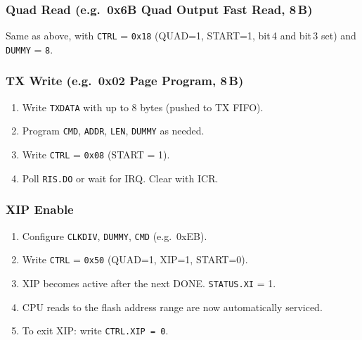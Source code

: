 \subsubsection{Quad Read (e.g.\ 0x6B Quad Output Fast Read, 8\,B)}

Same as above, with \texttt{CTRL} = \texttt{0x18} (QUAD=1, START=1, bit\,4 and bit\,3 set)
and \texttt{DUMMY} = \texttt{8}.

\subsubsection{TX Write (e.g.\ 0x02 Page Program, 8\,B)}

\begin{enumerate}
  \item Write \texttt{TXDATA} with up to 8 bytes (pushed to TX FIFO).
  \item Program \texttt{CMD}, \texttt{ADDR}, \texttt{LEN}, \texttt{DUMMY} as needed.
  \item Write \texttt{CTRL} = \texttt{0x08} (START = 1).
  \item Poll \texttt{RIS.DO} or wait for IRQ. Clear with ICR.
\end{enumerate}

\subsubsection{XIP Enable}

\begin{enumerate}
  \item Configure \texttt{CLKDIV}, \texttt{DUMMY}, \texttt{CMD} (e.g.\ 0xEB).
  \item Write \texttt{CTRL} = \texttt{0x50} (QUAD=1, XIP=1, START=0).
  \item XIP becomes active after the next DONE. \texttt{STATUS.XI} = 1.
  \item CPU reads to the flash address range are now automatically serviced.
  \item To exit XIP: write \texttt{CTRL.XIP = 0}.
\end{enumerate}

